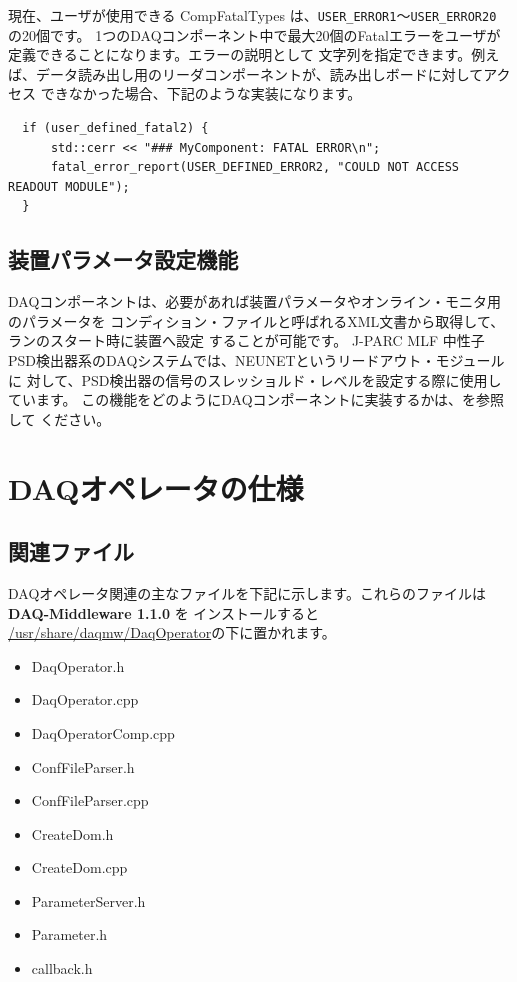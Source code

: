 \documentclass[a4j,10pt,dvips,onecolumn,oneside,final]{jarticle}%
\newcommand {\daqmwcurrent} {
	{\bf DAQ-Middleware 1.1.0}
}
\begin{document}
現在、ユーザが使用できる CompFatalTypes は、\verb|USER_ERROR1|〜\verb|USER_ERROR20| の20個です。
1つのDAQコンポーネント中で最大20個のFatalエラーをユーザが定義できることになります。エラーの説明として
文字列を指定できます。例えば、データ読み出し用のリーダコンポーネントが、読み出しボードに対してアクセス
できなかった場合、下記のような実装になります。
\begin{Verbatim}
  if (user_defined_fatal2) {
      std::cerr << "### MyComponent: FATAL ERROR\n";
      fatal_error_report(USER_DEFINED_ERROR2, "COULD NOT ACCESS READOUT MODULE");
  }
\end{Verbatim}

\subsection{装置パラメータ設定機能}\label{comp-cond}
DAQコンポーネントは、必要があれば装置パラメータやオンライン・モニタ用のパラメータを
コンディション・ファイルと呼ばれるXML文書から取得して、ランのスタート時に装置へ設定
することが可能です。
J-PARC MLF 中性子PSD検出器系のDAQシステムでは、NEUNETというリードアウト・モジュールに
対して、PSD検出器の信号のスレッショルド・レベルを設定する際に使用しています。
この機能をどのようにDAQコンポーネントに実装するかは、\cite{Cond-manual}を参照して
ください。

\section{DAQオペレータの仕様}\label{daqop}
\subsection{関連ファイル}

DAQオペレータ関連の主なファイルを下記に示します。これらのファイルは\daqmwcurrent を
インストールすると \url{/usr/share/daqmw/DaqOperator}の下に置かれます。
\begin{itemize}
\item DaqOperator.h
\item DaqOperator.cpp
\item DaqOperatorComp.cpp
\item ConfFileParser.h
\item ConfFileParser.cpp
\item CreateDom.h
\item CreateDom.cpp
\item ParameterServer.h
\item Parameter.h
\item callback.h
\end{itemize}
\end{document}
